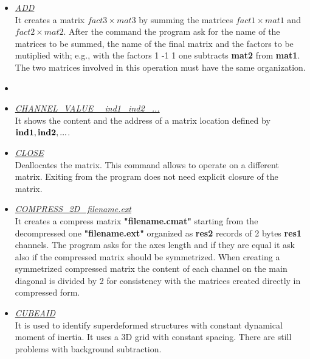 \bigskip
\bigskip     

\begin{itemize}

 \item	{\it\underline{ADD}} \\

	It creates a matrix {\bf $fact3 \times mat3$} by summing the matrices 
	{\bf $fact1 \times mat1$} and {\bf $fact2 \times mat2$}. After the
	command the program ask for the name of the matrices to be summed, the 
	name of the final matrix and the factors to be mutiplied with; e.g.,
	with the factors 1 -1 1 one subtracts {\bf mat2} from {\bf mat1}. The
	two matrices involved in this operation must have the same
	organization.

 \item	{\it{}} \\



 \item	{\it\underline{CHANNEL\_VALUE ~~ind1 ~ind2 ~...}} \\

	It shows the content and the address of a matrix location defined by
	${\bf ind1, ind2, ...}$.

 \item	{\it\underline{CLOSE}} \\

	Deallocates the matrix. This command allows to operate on a different
	matrix. Exiting from the program does not need explicit closure of the
	matrix.

 \item	{\it\underline{COMPRESS\_2D ~filename.ext}} \\

	It creates a compress matrix {\bf "filename.cmat"} starting from the
	decompressed one {\bf "filename.ext"} organized as {\bf res2} records
	of 2 bytes {\bf res1} channels. The program asks for the axes length
	and if they are equal it ask also if the compressed matrix should be
	symmetrized. When creating a symmetrized compressed matrix the content
	of each channel on the main diagonal is divided by 2 for consistency
	with the matrices created directly in compressed form.

 \item	{\it\underline{CUBEAID}} \\

	It is used to identify superdeformed structures with constant dynamical
	moment of inertia. It uses a 3D grid with constant spacing. There are 
	still problems with background subtraction.


\end{itemize}
